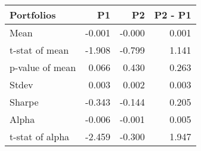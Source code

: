 \begin{tabular}{lrrr}
\toprule
Portfolios & P1 & P2 & P2 - P1 \\
\midrule
Mean & -0.001 & -0.000 & 0.001 \\
t-stat of mean & -1.908 & -0.799 & 1.141 \\
p-value of mean & 0.066 & 0.430 & 0.263 \\
Stdev & 0.003 & 0.002 & 0.003 \\
Sharpe & -0.343 & -0.144 & 0.205 \\
Alpha & -0.006 & -0.001 & 0.005 \\
t-stat of alpha & -2.459 & -0.300 & 1.947 \\
\bottomrule
\end{tabular}

